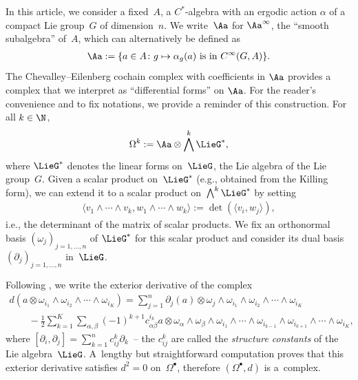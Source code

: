 In this article, we consider a f\/ixed~$A$, a $C^*$-algebra with an ergodic action $\alpha$ of a compact Lie group~$G$ of dimension~$n$. We write~$\Aa$ for $\Aa^\infty$, the ``smooth subalgebra'' of~$A$, which can alternatively be def\/ined as
\begin{gather*}
\Aa := \{ a \in A \colon g \mapsto \alpha_g(a) \text{ is in }C^\infty (G, A) \}.
\end{gather*}
The Chevalley--Eilenberg cochain complex with coef\/f\/icients in $\Aa$ provides a complex that we interpret as ``dif\/ferential forms'' on $\Aa$. For the reader's convenience and to f\/ix notations, we provide a reminder of this construction. For all $k \in \N$,
\begin{gather*}
\Omega^k := \Aa \otimes \bigwedge^k \LieG^*,
\end{gather*}
where $\LieG^*$ denotes the linear forms on~$\LieG$, the Lie algebra of the Lie group~$G$. Given a scalar product on~$\LieG^*$ (e.g., obtained from the Killing form), we can extend it to a scalar product on~$\bigwedge^k \LieG^*$ by setting
\begin{gather*}
\langle v_1 \wedge \cdots \wedge v_k, w_1 \wedge \cdots \wedge w_k \rangle := \det( \langle v_i, w_j \rangle ),
\end{gather*}
i.e., the determinant of the matrix of scalar products. We f\/ix an orthonormal basis $(\omega_j)_{j = 1, \ldots , n}$ of $\LieG^*$ for this scalar product and consider its dual basis $(\partial _j)_{j=1, \ldots , n}$ in~$\LieG$.

Following \cite[the model of~(4.6), p.~157]{KnappLieGp}, we write the exterior derivative of the complex
\begin{gather}
d( a \otimes \omega_{i_1} \wedge \omega_{i_2} \wedge \cdots \wedge \omega_{i_K} ) =\sum_{j = 1}^n \partial _j(a) \otimes \omega_j \wedge \omega_{i_1} \wedge \omega_{i_2} \wedge \cdots \wedge \omega_{i_K} \nonumber\\
\qquad{}
 - \frac{1}{2} \sum_{k=1}^K \sum_{\alpha, \beta} (-1)^{k+1} c^{i_k}_{\alpha \beta} a \otimes \omega_\alpha \wedge \omega_\beta \wedge \omega_{i_1} \wedge \cdots \wedge \omega_{i_{k-1}} \wedge \omega_{i_{k+1}} \wedge \cdots \wedge \omega_{i_K},\label{Eqn:Defd}
\end{gather}
where $[\partial _i, \partial _j] = \sum\limits_{k=1}^n c^k_{i j} \partial _k$~-- the $c^{k}_{i j}$ are called the \emph{structure constants} of the Lie algebra~$\LieG$. A~lengthy but straightforward computation proves that this exterior derivative satisf\/ies $d^2 = 0$ on~$\Omega^\bullet$, therefore $(\Omega^\bullet , d)$ is a~complex.

